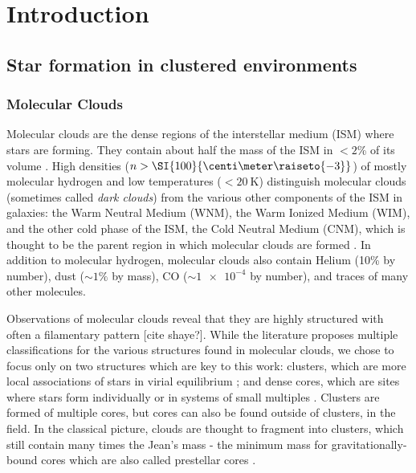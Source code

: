 \chapter{Introduction} %

\label{chap:introduction}



\section{Star formation in clustered environments}

\subsection{Molecular Clouds}

Molecular clouds are the dense regions of the interstellar medium (ISM) where stars are forming. They contain about half the mass of the ISM in $<2$\% of its volume \citep{Ferriere:2001gv}. High densities ($n > \SI{100}{\centi\meter\raiseto{-3}}$) of mostly molecular hydrogen and low temperatures ($< \SI{20}{\kelvin}$) distinguish molecular clouds (sometimes called \textit{dark clouds}) from the various other components of the ISM in galaxies: the Warm Neutral Medium (WNM), the Warm Ionized Medium (WIM), and the other cold phase of the ISM, the Cold Neutral Medium (CNM), which is thought to be the parent region in which molecular clouds are formed \citep{Kennicutt:2012ey}. In addition to molecular hydrogen, molecular clouds also contain Helium (10\% by number), dust ($\sim 1\%$ by mass), CO ($\sim \num{1e-4}$ by number), and traces of many other molecules.

Observations of molecular clouds reveal that they are highly structured with often a filamentary pattern [cite shaye?]. While the literature proposes multiple classifications for the various structures found in molecular clouds, we chose to focus only on two structures which are key to this work: clusters, which are more local associations of stars in virial equilibrium \citep{Lada:2003il}; and dense cores, which are sites where stars form individually or in systems of small multiples \citep{Williams:2000wl}. Clusters are formed of multiple cores, but cores can also be found outside of clusters, in the field. In the classical picture, clouds are thought to fragment into clusters, which still contain many times the Jean's mass - the minimum mass for gravitationally-bound cores \citep{Larson:1994cj} which are also called prestellar cores \citep{DiFrancesco:2007vg}.

